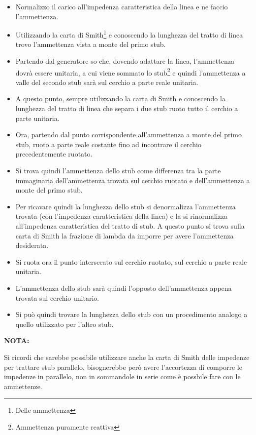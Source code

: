 			\begin{itemize}
			
			\item Normalizzo il carico all'impedenza caratteristica della linea e ne faccio l'ammettenza.
			\item Utilizzando la carta di Smith\footnote{Delle ammettenza} e conoscendo la lunghezza del tratto di linea trovo l'ammettenza vista a monte del primo stub.  
			\item Partendo dal generatore so che, dovendo adattare la linea, l'ammettenza dovrà essere unitaria, a cui viene sommato lo stub\footnote{Ammettenza puramente reattiva} e quindi l'ammettenza a valle del secondo stub sarà sul cerchio a parte reale unitaria.  
			\item A questo punto, sempre utilizzando la carta di Smith e conoscendo la lunghezza del tratto di linea che separa i due stub ruoto tutto il cerchio a parte unitaria.
			\item Ora, partendo dal punto corrispondente all'ammettenza a monte del primo stub, ruoto a parte reale costante fino ad incontrare il cerchio precedentemente ruotato.
			\item Si trova quindi l'ammettenza dello stub come differenza tra la parte immaginaria dell'ammettenza trovata sul cerchio ruotato e dell'ammettenza a monte del primo stub. 
			\item Per ricavare quindi la lunghezza dello stub si denormalizza l'ammettenza trovata (con l'impedenza caratteristica della linea) e la si rinormalizza all'impedenza caratteristica del tratto di stub. A questo punto si trova sulla carta di Smith la frazione di lambda da imporre per avere l'ammettenza desiderata.  
			\item Si ruota ora il punto intersecato sul cerchio ruotato, sul cerchio a parte reale unitaria.
			\item L'ammettenza dello stub sarà quindi l'opposto dell'ammettenza appena trovata sul cerchio unitario.
			\item Si può quindi trovare la lunghezza dello stub con un procedimento analogo a quello utilizzato per l'altro stub.
			
			\end{itemize}

	\textbf{NOTA:}

	Si ricordi che sarebbe possibile utilizzare anche la carta di Smith delle impedenze per trattare stub parallelo, bisognerebbe però avere l'accortezza di comporre le impedenze in parallelo, non in sommandole in serie come è possbile fare con le ammettenze.

